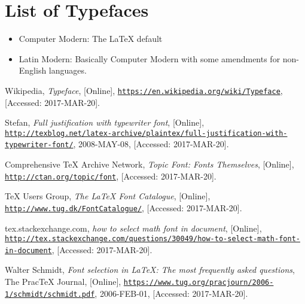 \documentclass[a4paper,oneside,11pt]{article}
\begin{document}
\section{List of Typefaces}
\label{sec:tflist}

\begin{itemize}
    \item Computer Modern: The \LaTeX{} default
    \item  
        Latin  Modern: Basically  Computer  Modern with  some  amendments  for
        non-English languages.
\end{itemize}


\begin{thebibliography}{1}
        
        Wikipedia,
        \emph{Typeface},
        [Online],
        \href{https://en.wikipedia.org/wiki/Typeface}
             {\nolinkurl{https://en.wikipedia.org/wiki/Typeface}},
        [Accessed: 2017-MAR-20].

        Stefan,
        \emph{Full justification with typewriter font},
        [Online],
        \href{http://texblog.net/latex-archive/plaintex/full-justification-with-typewriter-font/}
             {\nolinkurl{http://texblog.net/latex-archive/plaintex/full-justification-with-typewriter-font/}},
        2008-MAY-08,
        [Accessed: 2017-MAR-20].

        Comprehensive \TeX{} Archive Network,
        \emph{Topic Font: Fonts Themselves},
        [Online],
        \href{http://ctan.org/topic/font}
             {\nolinkurl{http://ctan.org/topic/font}},
        [Accessed: 2017-MAR-20].

        \TeX{} Users Group,
        \emph{The \LaTeX{} Font Catalogue},
        [Online],
        \href{http://www.tug.dk/FontCatalogue/}
             {\nolinkurl{http://www.tug.dk/FontCatalogue/}},
        [Accessed: 2017-MAR-20].

        tex.stackexchange.com,
        \emph{how to select math font in document},
        [Online],
        \href{http://tex.stackexchange.com/questions/30049/how-to-select-math-font-in-document}
             {\nolinkurl{http://tex.stackexchange.com/questions/30049/how-to-select-math-font-in-document}},
        [Accessed: 2017-MAR-20].
        
        Walter Schmidt,
        \emph{Font selection in \LaTeX{}: The most frequently asked questions},
        The Prac\TeX{} Journal,
        [Online],
        \href{https://www.tug.org/pracjourn/2006-1/schmidt/schmidt.pdf}
             {\nolinkurl{https://www.tug.org/pracjourn/2006-1/schmidt/schmidt.pdf}},
        2006-FEB-01,
        [Accessed: 2017-MAR-20].


\end{thebibliography}
\end{document}
